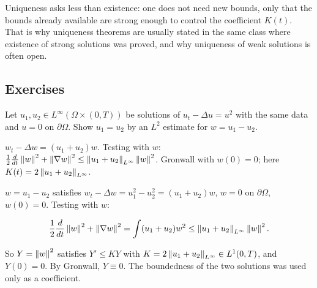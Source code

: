 Uniqueness asks less than existence: one does not need new bounds, only that the bounds already available are strong enough to control the coefficient $K(t)$. That is why uniqueness theorems are usually stated in the same class where existence of strong solutions was proved, and why uniqueness of weak solutions is often open.

\subsection*{Exercises}

\begin{exercise}
  Let $u_1, u_2 \in L^\infty(\Omega\times(0,T))$ be solutions of $u_t - \Delta u = u^2$ with the same data and $u = 0$ on $\partial\Omega$. Show $u_1 = u_2$ by an $L^2$ estimate for $w = u_1 - u_2$.
  \begin{hint}
    $w_t - \Delta w = (u_1 + u_2)w$. Testing with $w$: $\frac12\frac{d}{dt}\left\lVert w\right\rVert^2 + \left\lVert \nabla w\right\rVert^2 \le \left\lVert u_1 + u_2\right\rVert_{L^\infty}\left\lVert w\right\rVert^2$. Gronwall with $w(0) = 0$; here $K(t) = 2\left\lVert u_1 + u_2\right\rVert_{L^\infty}$.
  \end{hint}
  \begin{solution}
    $w = u_1 - u_2$ satisfies $w_t - \Delta w = u_1^2 - u_2^2 = (u_1 + u_2)w$, $w = 0$ on $\partial\Omega$, $w(0) = 0$. Testing with $w$:

    \[ \frac12\frac{d}{dt}\left\lVert w\right\rVert^2 + \left\lVert \nabla w\right\rVert^2 = \int(u_1 + u_2)w^2 \le \left\lVert u_1 + u_2\right\rVert_{L^\infty}\left\lVert w\right\rVert^2. \]

    So $Y = \left\lVert w\right\rVert^2$ satisfies $Y' \le KY$ with $K = 2\left\lVert u_1 + u_2\right\rVert_{L^\infty} \in L^1(0,T)$, and $Y(0) = 0$. By Gronwall, $Y \equiv 0$. The boundedness of the two solutions was used only as a coefficient.
  \end{solution}
\end{exercise}

